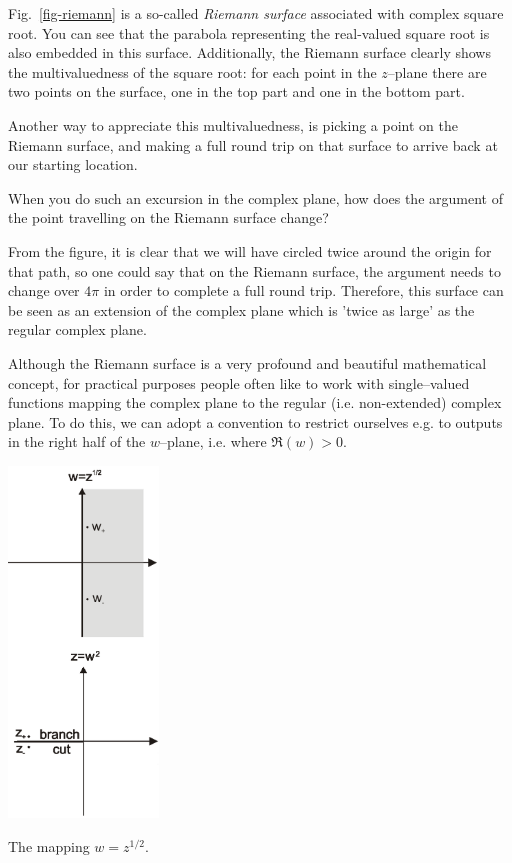 Fig.~\ref{fig-riemann} is a so-called \emph{Riemann surface} associated with complex square root. You can see that the parabola representing the real-valued square root is also embedded in this surface. Additionally, the Riemann surface clearly shows the multivaluedness of the square root: for each point in the $z$--plane there are two points on the surface, one in the top part and one in the bottom part. 

Another way to appreciate this multivaluedness, is picking a point on the Riemann surface, and making a full round trip on that surface to arrive back at our starting location.

\begin{cue}
When you do such an excursion in the complex plane, how does the argument of the point travelling on the Riemann surface change? 
\end{cue}

From the figure, it is clear that we will have circled twice around the origin for that path, so one could say that on the Riemann surface, the argument needs to change over $4 \pi$ in order to complete a full round trip. Therefore, this  surface can be seen as an extension of the complex plane which is 'twice as large' as the regular complex plane.

\pagebreak


Although the Riemann surface is a very profound and beautiful mathematical concept, for practical purposes people often like to work with single--valued functions mapping the complex plane to the regular (i.e. non-extended) complex plane. To do this, we can adopt a convention to restrict ourselves e.g. to outputs in the right half of the $w$--plane, i.e. where $\Re(w)>0$.


\begin{marginfigure}[-1cm]
\centering
\includegraphics[width=4cm]{complex/figures/branchcut_portrait}
\caption{The mapping $w=z^{1/2}$.}
\label{fig-branchcut}
\end{marginfigure}


